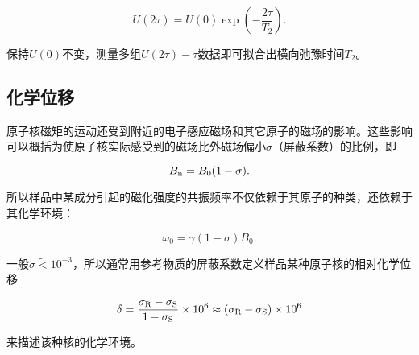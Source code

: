 \begin{equation}
U(2\tau)=U(0)\exp{\left(-\dfrac{2\tau}{T_2}\right)}.
\end{equation}

保持\(U(0)\)不变，测量多组\(U(2\tau)-\tau\)数据即可拟合出横向弛豫时间\(T_2\)。

\subsection{化学位移}\label{ux5316ux5b66ux4f4dux79fb}

原子核磁矩的运动还受到附近的电子感应磁场和其它原子的磁场的影响。这些影响可以概括为使原子核实际感受到的磁场比外磁场偏小\(\sigma\)（屏蔽系数）的比例，即

\begin{equation}
B_{\rm n}=B_0(1-\sigma).
\end{equation}

所以样品中某成分引起的磁化强度的共振频率不仅依赖于其原子的种类，还依赖于其化学环境：

\begin{equation}
\omega_0=\gamma(1-\sigma)B_0.\label{eq:omega0}
\end{equation}

一般\(\sigma\widetilde{<}10^{-3}\)，所以通常用参考物质的屏蔽系数定义样品某种原子核的相对化学位移

\begin{equation}
\delta=\dfrac{\sigma_{\rm R}-\sigma_{\rm S}}{1-\sigma_{\rm S}}\times10^{6}\approx{(\sigma_{\rm R}-\sigma_{\rm S})}\times10^{6}\label{eq:delta}
\end{equation}

来描述该种核的化学环境。
